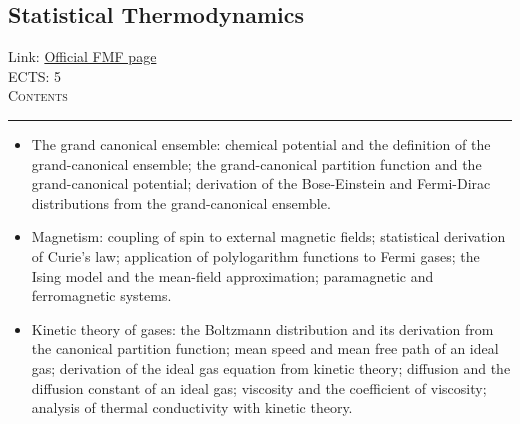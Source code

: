 \documentclass[11pt, a4paper]{article}
\newenvironment{course}[3]{
\subsection{#1}%
Link: \href{#2}{Official FMF page}\\%
ECTS: #3%
\vspace{1ex}
\\
{\large \textsc{Contents}}\\[-0.9ex]%
\rule{\textwidth}{0.5pt}
\vspace{-3ex}
}
{}
\newenvironment{chapter}[1]{
\begin{tcolorbox}[title=#1, breakable]
}
{\end{tcolorbox}}
\begin{document}
\begin{course}{Statistical Thermodynamics}{https://www.fmf.uni-lj.si/en/study-physics/programmes/1fiz/2020/7000777/courses/1174/}{5}
\begin{chapter}{Part 2: Statistical physics}
\begin{itemize}
            \item The grand canonical ensemble: chemical potential and the definition of the grand-canonical ensemble; the grand-canonical partition function and the grand-canonical potential; derivation of the Bose-Einstein and Fermi-Dirac distributions from the grand-canonical ensemble.

            \item Magnetism: coupling of spin to external magnetic fields; statistical derivation of Curie's law; application of polylogarithm functions to Fermi gases; the Ising model and the mean-field approximation; paramagnetic and ferromagnetic systems.

            \item Kinetic theory of gases: the Boltzmann distribution and its derivation from the canonical partition function; mean speed and mean free path of an ideal gas; derivation of the ideal gas equation from kinetic theory; diffusion and the diffusion constant of an ideal gas; viscosity and the coefficient of viscosity; analysis of thermal conductivity with kinetic theory.
        
        \end{itemize}
    \end{chapter}

\end{course}
\end{document}
